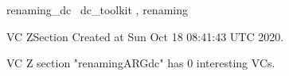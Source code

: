 \documentclass{article}
\begin{document}

\begin{zsection}	 \SECTION renaming\_dc \parents~dc\_toolkit , renaming
\end{zsection}

\newcommand{\appliesTo}{\zbinop{appliesTo}} 
\newcommand{\appliesToNofix}{\zpreop{appliesToNofix}} 

VC ZSection Created at Sun Oct 18 08:41:43 UTC 2020.



 VC Z section "renamingARGdc" has $0$ interesting VCs.



\end{document}
